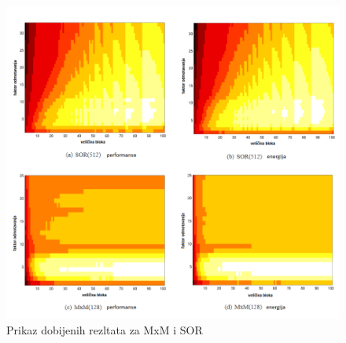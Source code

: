 \documentclass[a4paper]{article}
\begin{document}
\begin{figure}[p]
\includegraphics[scale=0.5]{performanse4}
\caption{Prikaz dobijenih rezltata za MxM i SOR}
\label{fig:slika5}
\end{figure}
\end{document}
